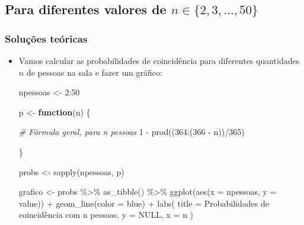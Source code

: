 \documentclass[
  11pt]{report}
\newenvironment{Shaded}{\begin{snugshade}}{\end{snugshade}}
\newcommand{\AttributeTok}[1]{\textcolor[rgb]{0.77,0.63,0.00}{#1}}
\newcommand{\CommentTok}[1]{\textcolor[rgb]{0.56,0.35,0.01}{\textit{#1}}}
\newcommand{\ConstantTok}[1]{\textcolor[rgb]{0.00,0.00,0.00}{#1}}
\newcommand{\ControlFlowTok}[1]{\textcolor[rgb]{0.13,0.29,0.53}{\textbf{#1}}}
\newcommand{\DecValTok}[1]{\textcolor[rgb]{0.00,0.00,0.81}{#1}}
\newcommand{\FunctionTok}[1]{\textcolor[rgb]{0.00,0.00,0.00}{#1}}
\newcommand{\NormalTok}[1]{#1}
\newcommand{\OtherTok}[1]{\textcolor[rgb]{0.56,0.35,0.01}{#1}}
\newcommand{\SpecialCharTok}[1]{\textcolor[rgb]{0.00,0.00,0.00}{#1}}
\newcommand{\StringTok}[1]{\textcolor[rgb]{0.31,0.60,0.02}{#1}}
\renewenvironment{Shaded}{
    \begin{mdframed}[%
      roundcorner=2pt,%
      innerleftmargin=5pt,%
      innerrightmargin=5pt,%
      topline=true,%
      leftline=true,%
      rightline=true,%
      bottomline=true,%
      linewidth=0.5pt,%
      linecolor=black!20,%
      backgroundcolor=black!2,%
      skipabove=2ex,%
      skipbelow=2.5ex%
    ]%
  }
  {
    \end{mdframed}
  }
\begin{document}
\hypertarget{para-diferentes-valores-de-n-in-2-3-ldots-50}{%
\subsection{\texorpdfstring{Para diferentes valores de $n \in \{2, 3, \ldots, 50\}$}{Para diferentes valores de }}\label{para-diferentes-valores-de-n-in-2-3-ldots-50}}

\hypertarget{soluuxe7uxf5es-teuxf3ricas}{%
\subsubsection*{Soluções teóricas}\label{soluuxe7uxf5es-teuxf3ricas}}

\begin{itemize}
\item
  Vamos calcular as probabilidades de coincidência para diferentes quantidades $n$ de pessoas na sala e fazer um gráfico:

\begin{Shaded}
\begin{Highlighting}[]
\NormalTok{npessoas }\OtherTok{\textless{}{-}} \DecValTok{2}\SpecialCharTok{:}\DecValTok{50}

\NormalTok{p }\OtherTok{\textless{}{-}} \ControlFlowTok{function}\NormalTok{(n) \{}

  \CommentTok{\# Fórmula geral, para n pessoas}
  \DecValTok{1} \SpecialCharTok{{-}} \FunctionTok{prod}\NormalTok{((}\DecValTok{364}\SpecialCharTok{:}\NormalTok{(}\DecValTok{366} \SpecialCharTok{{-}}\NormalTok{ n))}\SpecialCharTok{/}\DecValTok{365}\NormalTok{)}

\NormalTok{\}}

\NormalTok{probs }\OtherTok{\textless{}{-}} \FunctionTok{sapply}\NormalTok{(npessoas, p)}

\NormalTok{grafico }\OtherTok{\textless{}{-}}\NormalTok{ probs }\SpecialCharTok{\%\textgreater{}\%} 
  \FunctionTok{as\_tibble}\NormalTok{() }\SpecialCharTok{\%\textgreater{}\%} 
  \FunctionTok{ggplot}\NormalTok{(}\FunctionTok{aes}\NormalTok{(}\AttributeTok{x =}\NormalTok{ npessoas, }\AttributeTok{y =}\NormalTok{ value)) }\SpecialCharTok{+}
    \FunctionTok{geom\_line}\NormalTok{(}\AttributeTok{color =} \StringTok{\textquotesingle{}blue\textquotesingle{}}\NormalTok{) }\SpecialCharTok{+}
    \FunctionTok{labs}\NormalTok{(}
      \AttributeTok{title =} \StringTok{\textquotesingle{}Probabilidades de coincidência com n pessoas\textquotesingle{}}\NormalTok{,}
      \AttributeTok{y =} \ConstantTok{NULL}\NormalTok{,}
      \AttributeTok{x =} \StringTok{\textquotesingle{}n\textquotesingle{}}
\NormalTok{    )}


\end{Highlighting}
\end{Shaded}
\end{itemize}
\end{document}
